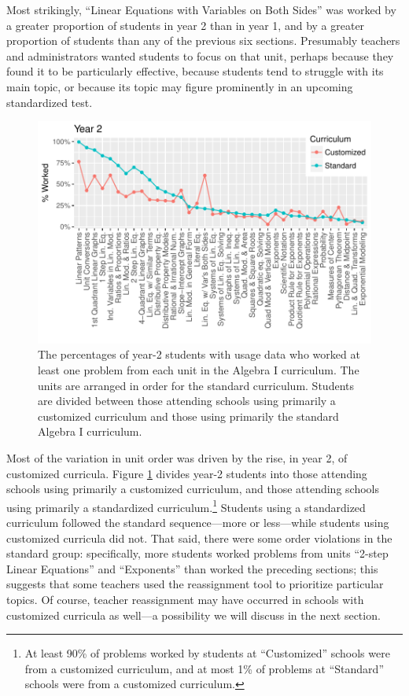 \documentclass[notitlepage,12pt]{jedm}\usepackage[]{graphicx}\usepackage[]{color}
\makeatletter
\def\maxwidth{ %
  \ifdim\Gin@nat@width>\linewidth
    \linewidth
  \else
    \Gin@nat@width
  \fi
}
\makeatother
\begin{document}
Most strikingly, ``Linear Equations with Variables on Both Sides'' was worked by a
greater proportion of students in year 2 than in year 1, and by a
greater proportion of students than any of the previous six sections.
Presumably teachers and administrators wanted students to focus on
that unit, perhaps because they found it to be particularly effective,
because students tend to struggle with its main topic, or because its
topic may figure prominently in an upcoming standardized test.

\begin{figure}
  \centering

\includegraphics[width=\maxwidth]{figure/unitsWorkedCust-1} 

\caption{The percentages of year-2 students with usage data who worked at
  least one problem from each unit in the Algebra I curriculum. The
  units are arranged in order for the standard curriculum. Students
  are divided between those attending schools using primarily a customized
  curriculum and those using primarily the standard Algebra I curriculum.}
\label{fig:unitsWorkedCust}
\end{figure}

Most of the variation in unit order was driven by the rise, in year 2,
of customized curricula.
Figure \ref{fig:unitsWorkedCust} divides year-2 students into those
attending schools using primarily a customized curriculum, and those
attending schools using primarily a standardized
curriculum.\footnote{At least
  90\% of
  problems worked by students at ``Customized'' schools were from a customized curriculum,
  and at most
  1\% of
  problems at ``Standard'' schools were from a customized curriculum.}
Students using a standardized curriculum followed the standard
sequence---more or less---while students using customized curricula
did not.
That said, there were some order violations in the standard group:
specifically, more students worked problems from units ``2-step Linear
Equations'' and ``Exponents'' than worked the preceding sections;
this suggests that some teachers used the reassignment tool to
prioritize particular topics.
Of course, teacher reassignment may have occurred in schools with customized
curricula as well---a possibility we will discuss in the next
section.
\end{document}
